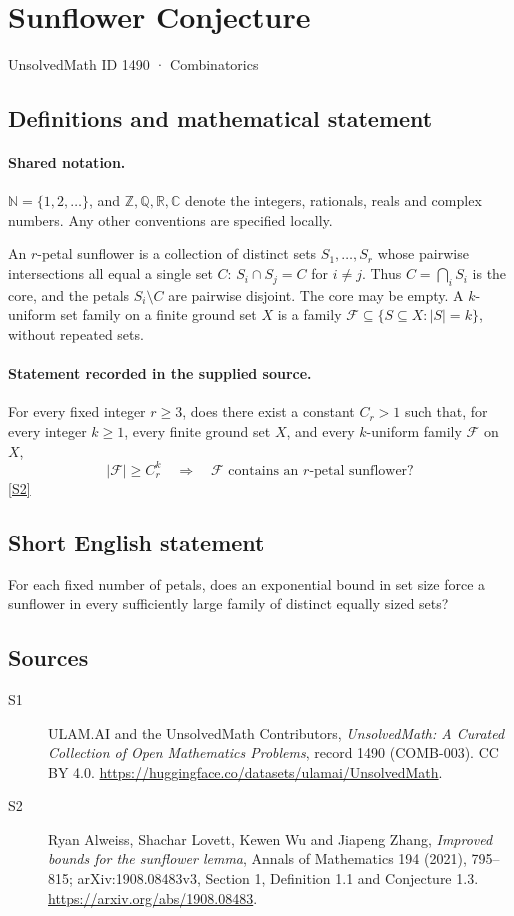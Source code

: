 \documentclass[11pt]{article}
\newcommand{\sref}[2]{\hyperlink{source:#1:#2}{[S#2]}}
\begin{document}
\setcounter{section}{1489}
\section{Sunflower Conjecture}\label{1490}
{\small\sffamily UnsolvedMath ID 1490 · Combinatorics}
\subsection{Definitions and mathematical statement}

\paragraph{Shared notation.}$\mathbb N=\{1,2,\ldots\}$, and $\mathbb Z,\mathbb Q,\mathbb R,\mathbb C$ denote the integers, rationals, reals and complex numbers. Any other conventions are specified locally.


An \(r\)-petal sunflower is a collection of distinct sets
\(S_1,\ldots,S_r\) whose pairwise intersections all equal a
single set \(C\): \(S_i\cap S_j=C\) for \(i\ne j\).
Thus \(C=\bigcap_i S_i\) is the core, and the petals \(S_i\setminus C\)
are pairwise disjoint. The core may be empty.
A \(k\)-uniform set family on a finite ground set \(X\) is a family
\(\mathcal F\subseteq\{S\subseteq X:|S|=k\}\), without repeated sets.
\paragraph{Statement recorded in the supplied source.}
For every fixed integer \(r\ge3\), does there exist a constant
\(C_r>1\) such that, for every integer \(k\ge1\), every finite ground set
\(X\), and every \(k\)-uniform family \(\mathcal F\) on \(X\),
\[
       |\mathcal F|\ge C_r^{k}
       \quad\Longrightarrow\quad
       \mathcal F\text{ contains an }r\text{-petal sunflower}?
\] \sref{1490}{2}
\subsection{Short English statement}
For each fixed number of petals, does an exponential bound in set size force a sunflower in every sufficiently large family of distinct equally sized sets?
\subsection{Sources}
\begin{description}
\item[\hypertarget{source:1490:1}{S1}] ULAM.AI and the UnsolvedMath Contributors, \emph{UnsolvedMath: A Curated Collection of Open Mathematics Problems}, record 1490 (COMB-003). CC BY 4.0. \url{https://huggingface.co/datasets/ulamai/UnsolvedMath}.
\item[\hypertarget{source:1490:2}{S2}] Ryan Alweiss, Shachar Lovett, Kewen Wu and Jiapeng Zhang, \emph{Improved bounds for the sunflower lemma}, Annals of Mathematics 194 (2021), 795--815; arXiv:1908.08483v3, Section 1, Definition 1.1 and Conjecture 1.3. \url{https://arxiv.org/abs/1908.08483}.
\end{description}
\label{end:1490}
\end{document}
